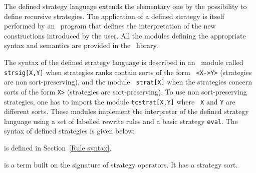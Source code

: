 The defined strategy language extends the elementary one by the possibility to
define recursive strategies.
The application of a defined strategy is itself performed by an \elan\ program
that defines the interpretation of the new constructions introduced by
the user.  All the modules defining the appropriate syntax and
semantics are provided in the \elan\ library.


The syntax of the defined strategy language is described in an \elan\ module
called {\tt strsig[X,Y]} when strategies ranks contain sorts of the form {\tt
<X->Y>} (strategies are non sort-preserving), and the module {\tt
strat[X]} when the strategies concern sorts of the form {\tt <X->X>}
(strategies are sort-preserving). To use non sort-preserving
strategies, one has to import the module {\tt tcstrat[X,Y]} where {\tt
X} and {\tt Y} are different sorts. These modules implement the
interpreter of the defined strategy language using a set of labelled
rewrite rules and a basic strategy {\tt eval}. The syntax of defined
strategies is given below: 




\noindent {} is defined in Section~\ref{Rule syntax}.

\noindent {} is a term built on the signature of strategy
operators. It has a strategy sort.


